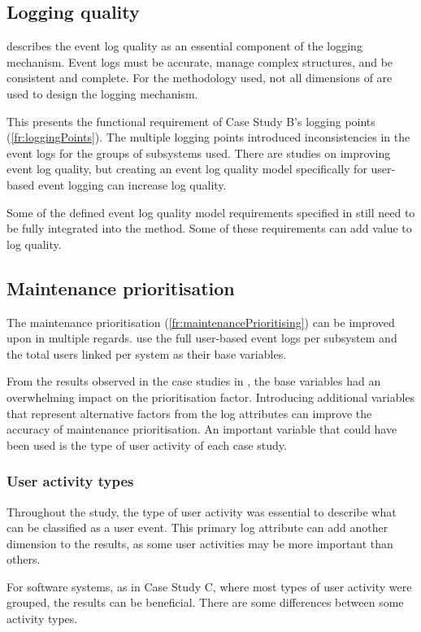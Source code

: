 \subsection{Logging quality}
 describes the event log quality as an essential component of the logging mechanism. Event logs must be accurate, manage complex structures, and be consistent and complete. For the methodology used, not all dimensions of  are used to design the logging mechanism.\par This presents the functional requirement of Case Study B's logging points (\ref{fr:loggingPoints}). The multiple logging points introduced inconsistencies in the event logs for the groups of subsystems used. There are studies on improving event log quality, but creating an event log quality model specifically for user-based event logging can increase log quality. \par Some of the defined event log quality model requirements specified in  still need to be fully integrated into the method. Some of these requirements can add value to log quality.

\subsection{Maintenance prioritisation}
The maintenance prioritisation (\ref{fr:maintenancePrioritising}) can be improved upon in multiple regards.  use the full user-based event logs per subsystem and the total users linked per system as their base variables. \par From the results observed in the case studies in , the base variables had an overwhelming impact on the prioritisation factor. Introducing additional variables that represent alternative factors from the log attributes can improve the accuracy of maintenance prioritisation. An important variable that could have been used is the type of user activity of each case study.

\subsubsection{User activity types}
Throughout the study, the type of user activity was essential to describe what can be classified as a user event. This primary log attribute can add another dimension to the results, as some user activities may be more important than others. \par For software systems, as in Case Study C, where most types of user activity were grouped, the results can be beneficial. There are some differences between some activity types. 

